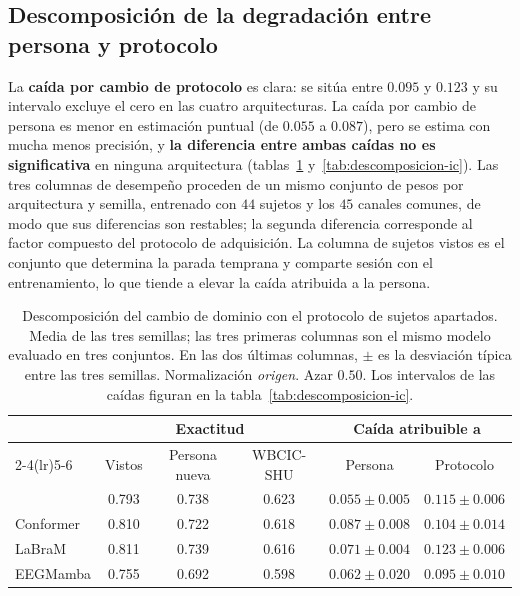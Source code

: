 \subsection{Descomposición de la degradación entre persona y protocolo}
\label{sec:descomposicion}

La \textbf{caída por cambio de protocolo} es clara: se sitúa entre $0.095$ y $0.123$ y su intervalo excluye
el cero en las cuatro arquitecturas. La caída por cambio de persona es menor en estimación puntual (de
$0.055$ a $0.087$), pero se estima con mucha menos precisión, y \textbf{la diferencia entre ambas caídas no
es significativa} en ninguna arquitectura (tablas~\ref{tab:descomposicion} y~\ref{tab:descomposicion-ic}).
Las tres columnas de desempeño proceden de un mismo conjunto de pesos por arquitectura y semilla, entrenado
con $44$ sujetos y los $45$ canales comunes, de modo que sus diferencias son restables; la segunda diferencia
corresponde al factor compuesto del protocolo de adquisición. La columna de sujetos vistos es el conjunto
que determina la parada temprana y comparte sesión con el entrenamiento, lo que tiende a elevar la caída
atribuida a la persona.

\begin{table}[H]
\centering
\caption{Descomposición del cambio de dominio con el protocolo de sujetos apartados. Media de
las tres semillas; las tres primeras columnas son el mismo modelo evaluado en tres conjuntos. En las dos
últimas columnas, $\pm$ es la desviación típica entre las tres semillas. Normalización
\emph{origen}. Azar $0.50$. Los intervalos de las caídas figuran en la
tabla~\ref{tab:descomposicion-ic}.}
\label{tab:descomposicion}
\small
\begin{tabular}{lccccc}
\toprule
 & \multicolumn{3}{c}{\textbf{Exactitud}} & \multicolumn{2}{c}{\textbf{Caída atribuible a}} \\
\cmidrule(lr){2-4}\cmidrule(lr){5-6}
 & Vistos & Persona nueva & WBCIC-SHU & Persona & Protocolo \\
\midrule
\eegnet{} & 0.793 & 0.738 & 0.623 & $0.055 \pm 0.005$ & $0.115 \pm 0.006$ \\
Conformer & 0.810 & 0.722 & 0.618 & $0.087 \pm 0.008$ & $0.104 \pm 0.014$ \\
LaBraM & 0.811 & 0.739 & 0.616 & $0.071 \pm 0.004$ & $0.123 \pm 0.006$ \\
EEGMamba & 0.755 & 0.692 & 0.598 & $0.062 \pm 0.020$ & $0.095 \pm 0.010$ \\
\bottomrule
\end{tabular}
\end{table}

